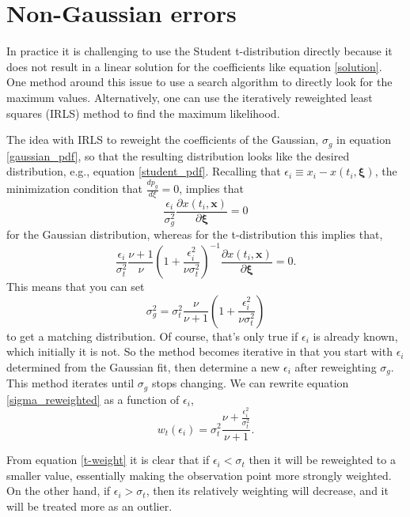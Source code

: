 \documentclass[twocol]{ametsoc}
\begin{document}
\section{Non-Gaussian errors}

In practice it is challenging to use the Student t-distribution directly because it does not result in a linear solution for the coefficients like equation \ref{solution}. One method around this issue to use a search algorithm to directly look for the maximum values. Alternatively, one can use the iteratively reweighted least squares (IRLS) method to find the maximum likelihood.

The idea with IRLS to reweight the coefficients of the Gaussian, $\sigma_g$ in equation \ref{gaussian_pdf}, so that the resulting distribution looks like the desired distribution, e.g., equation \ref{student_pdf}. Recalling that $\epsilon_i \equiv x_i - x(t_i,\mathbf{\xi})$, the minimization condition that $\frac{d p_g}{d\xi}=0$, implies that
\begin{equation}
\frac{\epsilon_i}{\sigma_g^2} \frac{\partial x(t_i,\mathbf{x})}{\partial \mathbf{\xi}} = 0
\end{equation}
for the Gaussian distribution, whereas for the t-distribution this implies that,
\begin{equation}
 \frac{\epsilon_i}{\sigma_t^2} \frac{\nu+1}{\nu} \left( 1 + \frac{\epsilon_i^2}{\nu \sigma_t^2} \right)^{-1}  \frac{\partial x(t_i,\mathbf{x})}{\partial \mathbf{\xi}}  = 0.
\end{equation}
This means that you can set
\begin{equation}
\sigma_g^2 =   \sigma_t^2 \frac{\nu}{\nu+1} \left( 1 + \frac{\epsilon_i^2}{\nu \sigma_t^2} \right)
\label{sigma_reweighted}
\end{equation}
to get a matching distribution. Of course, that's only true if $\epsilon_i$ is already known, which initially it is not. So the method becomes iterative in that you start with $\epsilon_i$ determined from the Gaussian fit, then determine a new $\epsilon_i$ after reweighting $\sigma_g$. This method iterates until $\sigma_g$ stops changing. We can rewrite equation \ref{sigma_reweighted} as a function of $\epsilon_i$,
\begin{equation}
\label{t-weight}
w_t(\epsilon_i) = \sigma_t^2 \frac{\nu  + \frac{\epsilon_i^2}{\sigma_t^2}}{\nu+1}.
\end{equation}

From equation \ref{t-weight} it is clear that if $\epsilon_i < \sigma_t$ then it will be reweighted to a smaller value, essentially making the observation point more strongly weighted. On the other hand, if $\epsilon_i > \sigma_t$, then its relatively weighting will decrease, and it will be treated more as an outlier.
\end{document}
